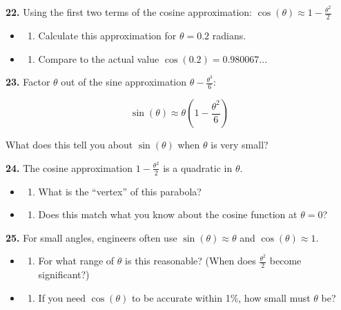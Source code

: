 \documentclass[
  11pt,
]{article}
\providecommand{\tightlist}{%
  \setlength{\itemsep}{0pt}\setlength{\parskip}{0pt}}
\begin{document}
\textbf{22.} Using the first two terms of the cosine approximation:
\(\cos(\theta) \approx 1 - \frac{\theta^2}{2}\)

\begin{itemize}
\item
  \begin{enumerate}
  \def\labelenumi{(\alph{enumi})}
  \tightlist
  \item
    Calculate this approximation for \(\theta = 0.2\) radians.
  \end{enumerate}
\item
  \begin{enumerate}
  \def\labelenumi{(\alph{enumi})}
  \setcounter{enumi}{1}
  \tightlist
  \item
    Compare to the actual value \(\cos(0.2) = 0.980067...\)
  \end{enumerate}
\end{itemize}

\textbf{23.} Factor \(\theta\) out of the sine approximation
\(\theta - \frac{\theta^3}{6}\):

\[\sin(\theta) \approx \theta\left(1 - \frac{\theta^2}{6}\right)\]

What does this tell you about \(\sin(\theta)\) when \(\theta\) is very
small?

\textbf{24.} The cosine approximation \(1 - \frac{\theta^2}{2}\) is a
quadratic in \(\theta\).

\begin{itemize}
\item
  \begin{enumerate}
  \def\labelenumi{(\alph{enumi})}
  \tightlist
  \item
    What is the ``vertex'' of this parabola?
  \end{enumerate}
\item
  \begin{enumerate}
  \def\labelenumi{(\alph{enumi})}
  \setcounter{enumi}{1}
  \tightlist
  \item
    Does this match what you know about the cosine function at
    \(\theta = 0\)?
  \end{enumerate}
\end{itemize}

\textbf{25.} For small angles, engineers often use
\(\sin(\theta) \approx \theta\) and \(\cos(\theta) \approx 1\).

\begin{itemize}
\item
  \begin{enumerate}
  \def\labelenumi{(\alph{enumi})}
  \tightlist
  \item
    For what range of \(\theta\) is this reasonable? (When does
    \(\frac{\theta^2}{2}\) become significant?)
  \end{enumerate}
\item
  \begin{enumerate}
  \def\labelenumi{(\alph{enumi})}
  \setcounter{enumi}{1}
  \tightlist
  \item
    If you need \(\cos(\theta)\) to be accurate within 1\%, how small
    must \(\theta\) be?
  \end{enumerate}
\end{itemize}
\end{document}
